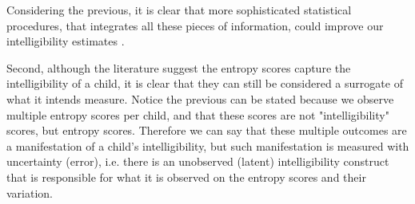 Considering the previous, it is clear that more sophisticated statistical procedures, that integrates all these pieces of information, could improve our intelligibility estimates \citep{McElreath_2020}.

\begin{comment}
	
	First, as previous paragraphs reveal, the intelligibility scores are `complex' in nature, however, such `complexity' is rarely fully considered in the statistical modeling procedure. The problem with the later is that, because the data does not fulfill the typical assumptions, e.g. normality, its analysis under such models might lead us to erroneous conclusions \textcolor{red}{[citation]}. On the one hand, outcomes such as the number of (un)intelligible words are discrete, while the entropy scores are continuous in nature. In addition, there is the consideration that both scores are constraint in specific bounds, i.e. the number of (un)intelligible words cannot be negative, while the entropy scores are in the bounds between zero and one. Finally, given the rating procedure's nature, the scores are produced in a clustered manner, i.e. we observe several score measurements per child. 
	
	So far the literature shows that, even when the data does not conform to the `normality' assumption, the applied statistical procedures are still supported on it, examples of this can be seen in \citep{Boonen_et_al_2021, Flipsen_et_al_2006} and \citep{Hustad_et_al_2020}. In addition, some papers in the literature have even used (hierarchical) multilevel modeling to deal with the clustered nature of the data, e.g. \citep{Boonen_et_al_2021}. However, to the authors knowledge, no paper have dealt with all of the data nuances at once, which leads us to believe that, by using more sophisticated statistical models we could improve our statistical inferences. 

\end{comment}

Second, although the literature suggest the entropy scores capture the intelligibility of a child, it is clear that they can still be considered a surrogate of what it intends measure. Notice the previous can be stated because we observe multiple entropy scores per child, and that these scores are not "intelligibility" scores, but entropy scores. Therefore we can say that these multiple outcomes are a manifestation of a child's intelligibility, but such manifestation is measured with uncertainty (error), i.e. there is an unobserved (latent) intelligibility construct that is responsible for what it is observed on the entropy scores and their variation. 

